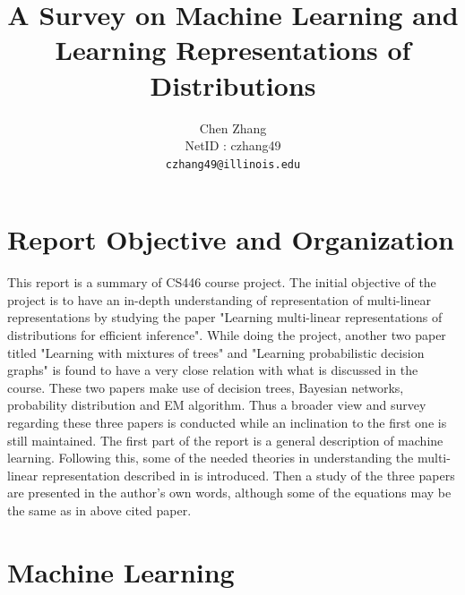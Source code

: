 \documentclass[11pt]{article}
\title{A Survey on Machine Learning and Learning Representations of Distributions}
\author{Chen Zhang \\
  NetID : czhang49\\
  {\tt czhang49@illinois.edu} 
}
\date{}
\begin{document}
\maketitle

\section{Report Objective and Organization}
This report is a summary of CS446 course project. The initial objective of the project is to have an in-depth understanding of representation of multi-linear representations by studying the paper "Learning multi-linear representations of distributions for efficient inference"\cite{roth2009learning}. While doing the project, another two paper titled "Learning with mixtures of trees"\cite{meila2001learning} and "Learning probabilistic decision graphs"\cite{jaeger2006learning} is found to have a very close relation with what is discussed in the course. These two papers make use of decision trees, Bayesian networks, probability distribution and EM algorithm. Thus a broader view and survey regarding these three papers is conducted while an inclination to the first one is still maintained. The first part of the report is a general description of machine learning. Following this, some of the needed theories in understanding the multi-linear representation described in \cite{roth2009learning}is introduced. Then a study of the three papers \cite{roth2009learning} are presented in the author's own words, although some of the equations may be the same as in above cited paper. 

\section{Machine Learning }
\end{document}
